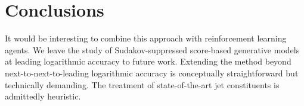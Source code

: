 \section{Conclusions}\label{sec:conclusions}

It would be interesting to combine this approach with reinforcement
learning agents. We leave the study of Sudakov-suppressed score-based
generative models at leading logarithmic accuracy to future work.
Extending the method beyond next-to-next-to-leading logarithmic accuracy
is conceptually straightforward but technically demanding. The treatment
of state-of-the-art jet constituents is admittedly heuristic.

